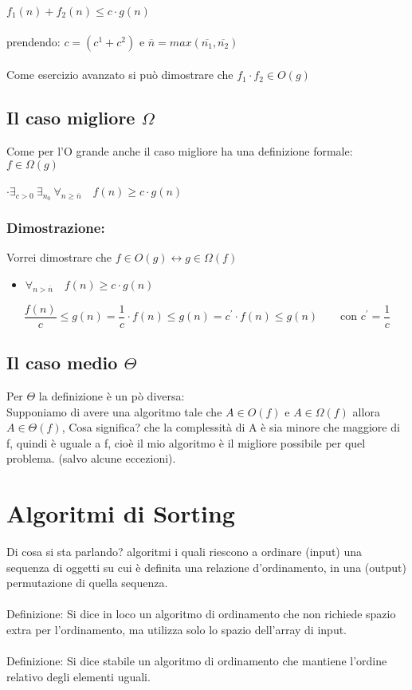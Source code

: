 \documentclass[a4paper,12pt]{article}
\begin{document}
$f_{1}(n) + f_{2}(n) \le c \cdot g(n) $\\
\\
prendendo:
$c = (c^{1} + c^{2})$  e  $\overline{n} = max(\overline{n_{1}}, \overline{n_{2}})$
\\
\\
Come esercizio avanzato si può dimostrare che $f_{1} \cdot f_{2} \in O(g)$

\subsection{Il caso migliore $\Omega$}
Come per l'O grande anche il caso migliore ha una definizione formale: \\
$f \in \Omega(g)$ \\ \\
\textbf{$\cdot \exists_{c > 0} \: \exists_{n_{0}} \: \forall_{n \ge \overline{n}} \quad f(n) \geq c \cdot g(n)$} \\

\subsubsection{{\textcolor{teorema}{Dimostrazione: }}}
Vorrei dimostrare che $f \in O(g) \leftrightarrow g \in \Omega(f)$
\begin{itemize}
    \item $\forall_{n > \overline{n}} \quad f(n) \ge c \cdot g(n) $
\end{itemize}
\[
    \frac{f(n)}{c} \le g(n) = \frac{1}{c} \cdot f(n) \le g(n) = c^{'} \cdot f(n) \le g(n) \qquad \text{con } c^{'} = \frac{1}{c}
\]

\subsection{Il caso medio $\Theta$}
Per $\Theta$ la definizione è un pò diversa: \\
Supponiamo di avere una algoritmo tale che $A \in O(f)$ e $A \in \Omega(f)$ allora $A \in \Theta(f)$, 
Cosa significa? che la complessità di A è sia minore che maggiore di f, quindi è uguale a f, cioè il mio algoritmo è il migliore possibile per quel problema. (salvo alcune eccezioni).


\section{Algoritmi di Sorting}
Di cosa si sta parlando? algoritmi i quali riescono a ordinare (input) una sequenza di oggetti su cui è definita una relazione d'ordinamento, in una (output) permutazione di quella sequenza.
\\
\\
\textcolor{teorema}{Definizione}: Si dice \textcolor{teorema}{in loco} un algoritmo di ordinamento che non richiede spazio extra per l'ordinamento, ma utilizza solo lo spazio dell'array di input. \\ \\
\textcolor{teorema}{Definizione}: Si dice \textcolor{teorema}{stabile} un algoritmo di ordinamento che mantiene l'ordine relativo degli elementi uguali. \\
\end{document}
